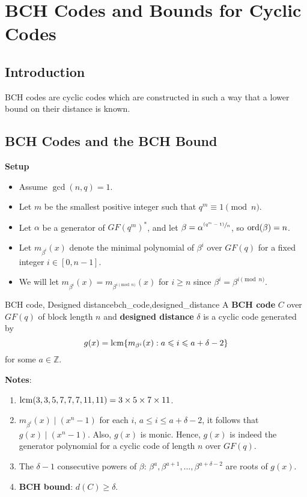 \chapter{BCH Codes and Bounds for Cyclic Codes}
\section{Introduction}
BCH codes are cyclic codes which are constructed in such a way that
a lower bound on their distance is known.

\section{BCH Codes and the BCH Bound}
\textbf{Setup}
\begin{itemize}
    \item Assume $ \gcd(n,q)=1 $.
    \item Let $ m $ be the smallest positive integer such that $ q^m\equiv 1\pmod{n} $.
    \item Let $ \alpha $ be a generator of $ GF(q^m)^* $, and let
          $ \beta=\alpha^{\sfrac{(q^m-1)}{n}} $, so $ \operatorname{ord}(\beta)=n $.
    \item Let $ m_{\beta^i}(x) $ denote the minimal polynomial of
          $ \beta^i $ over $ GF(q) $ for a fixed integer $ i\in[0,n-1] $.
    \item We will let $ m_{\beta^i}(x)=m_{\beta^{i\pmod{n}}}(x) $
          for $ i\geqslant n $ since $ \beta^i=\beta^{i\pmod{n}} $.
\end{itemize}

\begin{Definition}{BCH code, Designed distance}{bch_code,designed_distance}
    A \textbf{BCH code} $ C $ over $ GF(q) $ of block
    length $ n $ and \textbf{designed distance} $ \delta $
    is a cyclic code generated by
    \[ g(x)=\operatorname{lcm} \{m_{\beta^i}(x):a\leqslant i\leqslant a+\delta-2\} \]
    for some $ a\in\mathbb{Z} $.
\end{Definition}

\textbf{Notes}:
\begin{enumerate}[label=(\roman*)]
    \item $ \operatorname{lcm}(3,3,5,7,7,7,11,11)=3\times 5\times 7\times 11 $.
    \item $ m_{\beta^i}(x)\mid (x^n-1) $ for each $ i $,
          $ a\leqslant i\leqslant a+\delta-2 $, it follows that $ g(x)\mid (x^n-1) $.
          Also, $ g(x) $ is monic. Hence, $ g(x) $ is indeed the generator polynomial
          for a cyclic code of length $ n $ over $ GF(q) $.
    \item The $ \delta-1 $ consecutive powers of $ \beta $:
          $ \beta^a,\beta^{a+1},\ldots ,\beta^{a+\delta-2} $
          are roots of $ g(x) $.
    \item \textbf{BCH bound}: $ d(C)\geqslant \delta $.
\end{enumerate}


